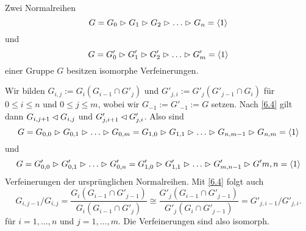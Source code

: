 \begin{satz} \label{6.5}
Zwei Normalreihen $$G=G_0\vartriangleright G_1\vartriangleright G_2\vartriangleright \ldots \vartriangleright G_n=\langle 1 \rangle$$ und 
                  $$G=G'_0\vartriangleright G'_1\vartriangleright G'_2\vartriangleright \ldots \vartriangleright G'_m=\langle 1 \rangle$$ einer Gruppe $G$ besitzen isomorphe Verfeinerungen.
\end{satz}
\begin{beweis}
 Wir bilden $G_{i,j}:=G_i(G_{i-1}\cap G'_j)$ und $G'_{j,i}:=G'_j(G'_{j-1}\cap G_i)$ f\"ur $0\leq i\leq n$ und $0\leq j\leq m$, wobei wir $G_{-1}:=G'_{-1}:=G$ setzen. Nach \ref{6.4} gilt dann $G_{i,j+1}\lhd G_{i,j}$ und $G'_{j,i+1}\lhd G'_{j,i}$. 
Also sind 
$$G=G_{0,0}\vartriangleright G_{0,1}\vartriangleright \ldots \vartriangleright G_{0,m}=G_{1,0}\vartriangleright G_{1,1}\vartriangleright \ldots \vartriangleright G_{n,m-1}\vartriangleright G_{n,m}=\langle 1 \rangle$$ und 
$$G=G'_{0,0}\vartriangleright G'_{0,1}\vartriangleright\ldots \vartriangleright G'_{0,n}=G'_{1,0}\vartriangleright G'_{1,1}\vartriangleright\ldots\vartriangleright G'_{m,n-1}\vartriangleright G'{m,n}=\langle 1 \rangle$$ Verfeinerungen der urspr\"unglichen Normalreihen. Mit \ref{6.4} folgt auch 
$$G_{i,j-1}/G_{i,j}=\frac{G_i(G_{i-1}\cap G'_{j-1})}{G_i(G_{i-1}\cap G'_j)}\cong\frac{G'_j(G_{i-1}\cap G'_{j-1})}{G'_j(G_i\cap G'_{j-1})}=G'_{j,i-1}/G'_{j,i}.$$ f\"ur $i=1,\ldots,n$ und $j=1,\ldots,m$. Die Verfeinerungen sind also isomorph.
\end{beweis}


